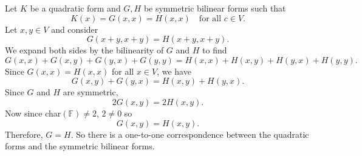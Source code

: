 \documentclass[12pt]{article}
\newcommand{\F}{\mathbb{F}}
\begin{document}
Let $K$ be a quadratic form and $G,H$ be symmetric bilinear forms such that
\[K(x) = G(x,x) = H(x,x) \quad\text{for all } c\in V.\]
Let $x,y\in V$ and consider
\[G(x+y, x+y) = H(x+y,x+y).\]
We expand both sides by the bilinearity of $G$ and $H$ to find
\[G(x,x) + G(x,y) + G(y,x) + G(y,y) = H(x,x) + H(x,y) + H(y,x) + H(y,y).\]
Since $G(x,x)=H(x,x)$ for all $x\in V$, we have
\[G(x,y) + G(y,x) = H(x,y) + H(y,x).\]
Since $G$ and $H$ are symmetric, 
\[2G(x,y) = 2H(x,y).\]
Now since char$(\F)\ne 2$, $2\ne 0$ so
\[G(x,y) = H(x,y).\]
Therefore, $G=H$. So there is a one-to-one correspondence between the quadratic forms and the symmetric bilinear forms.
\end{document}
